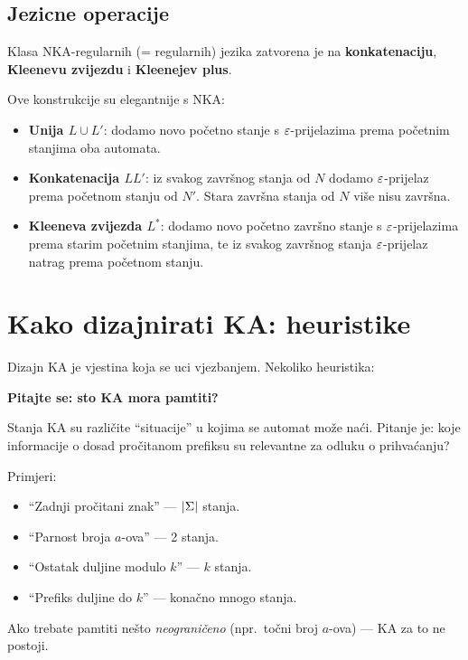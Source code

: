 \subsection{Jezicne operacije}

\begin{propozicija}
Klasa NKA-regularnih (= regularnih) jezika zatvorena je na
\textbf{konkatenaciju}, \textbf{Kleenevu zvijezdu} i \textbf{Kleenejev plus}.
\end{propozicija}

Ove konstrukcije su elegantnije s NKA:
\begin{itemize}
    \item \textbf{Unija $L \cup L'$}: dodamo novo početno stanje s
      $\varepsilon$-prijelazima prema početnim stanjima oba automata.
    \item \textbf{Konkatenacija $LL'$}: iz svakog završnog stanja
      od $N$ dodamo $\varepsilon$-prijelaz prema početnom stanju od $N'$.
      Stara završna stanja od $N$ više nisu završna.
    \item \textbf{Kleeneva zvijezda $L^*$}: dodamo novo početno završno
      stanje s $\varepsilon$-prijelazima prema starim početnim stanjima,
      te iz svakog završnog stanja $\varepsilon$-prijelaz natrag prema
      početnom stanju.
\end{itemize}

\section{Kako dizajnirati KA: heuristike}

Dizajn KA je vjestina koja se uci vjezbanjem. Nekoliko heuristika:

\begin{kljucno}
\textbf{Pitajte se: sto KA mora pamtiti?}

Stanja KA su različite ``situacije'' u kojima se automat može naći.
Pitanje je: koje informacije o dosad pročitanom prefiksu su relevantne
za odluku o prihvaćanju?

Primjeri:
\begin{itemize}
  \item ``Zadnji pročitani znak'' --- $|\Sigma|$ stanja.
  \item ``Parnost broja $a$-ova'' --- 2 stanja.
  \item ``Ostatak duljine modulo $k$'' --- $k$ stanja.
  \item ``Prefiks duljine do $k$'' --- konačno mnogo stanja.
\end{itemize}
Ako trebate pamtiti nešto \emph{neograničeno} (npr.\ točni broj $a$-ova)
--- KA za to ne postoji.
\end{kljucno}

